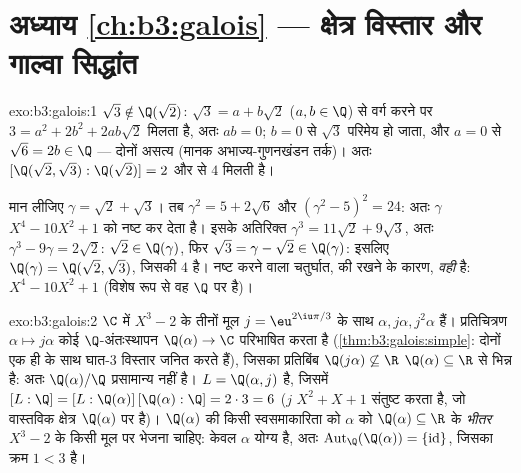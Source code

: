 \section*{अध्याय \ref{ch:b3:galois} --- क्षेत्र विस्तार और
गाल्वा सिद्धांत}

\begin{solution}{exo:b3:galois:1}
$\sqrt3 \notin \Q(\sqrt2)$: $\sqrt3 = a + b\sqrt2$ ($a, b
\in \Q$) से वर्ग करने पर $3 = a^2 + 2b^2 + 2ab\sqrt2$ मिलता है, अतः $ab =
0$; $b = 0$ से $\sqrt3$
परिमेय हो जाता, और $a = 0$ से $\sqrt6 = 2b
\in \Q$ --- दोनों असत्य (मानक अभाज्य-गुणनखंडन
तर्क)। अतः $[\Q(\sqrt2,\sqrt3) : \Q(\sqrt2)] = 2$ और  से  $4$ मिलती है।

मान लीजिए $\gamma = \sqrt2 + \sqrt3$। तब $\gamma^2 = 5 + 2\sqrt6$ और $(\gamma^2 - 5)^2 = 24$: अतः $\gamma$ $X^4 - 10X^2 + 1$ को नष्ट कर देता है।
इसके अतिरिक्त $\gamma^3 = 11\sqrt2 + 9\sqrt3$, अतः $\gamma^3 - 9\gamma
= 2\sqrt2$: $\sqrt2 \in \Q(\gamma)$, फिर $\sqrt3 = \gamma -
\sqrt2 \in \Q(\gamma)$: इसलिए $\Q(\gamma) = \Q(\sqrt2,\sqrt3)$, जिसकी
 $4$ है। नष्ट करने वाला चतुर्घात,  की  रखने के
कारण, \emph{वही}  है: $X^4 -
10X^2 + 1$ (विशेष रूप से वह $\Q$ पर
 है)।
\end{solution}

\begin{solution}{exo:b3:galois:2}
$\C$ में $X^3 - 2$ के तीनों मूल $j = \eu^{2\iu\pi/3}$ के साथ $\alpha, j\alpha,
j^2\alpha$ हैं। प्रतिचित्रण $\alpha \mapsto
j\alpha$
कोई $\Q$-अंतःस्थापन $\Q(\alpha) \to \C$ परिभाषित करता है (\cref{thm:b3:galois:simple}: दोनों एक ही  के साथ घात-$3$ विस्तार जनित करते हैं), जिसका प्रतिबिंब $\Q(j\alpha)
\not\subseteq \R$
$\Q(\alpha) \subseteq \R$ से भिन्न है: अतः $\Q(\alpha)/\Q$ प्रसामान्य नहीं है।  $L =
\Q(\alpha, j)$
है, जिसमें $[L:\Q] = [L:\Q(\alpha)]\,[\Q(\alpha):\Q] =
2 \cdot 3 = 6$ ($j$ $X^2 + X + 1$ संतुष्ट करता है, जो वास्तविक क्षेत्र
$\Q(\alpha)$ पर  है)। $\Q(\alpha)$ की किसी स्वसमाकारिता को $\alpha$ को $\Q(\alpha) \subseteq \R$ के
\emph{भीतर} $X^3 - 2$ के किसी मूल पर भेजना चाहिए: केवल $\alpha$ योग्य है,
अतः $\operatorname{Aut}_\Q(\Q(\alpha)) = \{\mathrm{id}\}$, जिसका क्रम $1 < 3$ है।
\end{solution}

